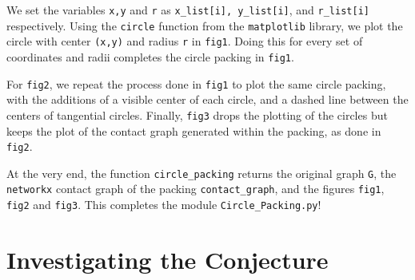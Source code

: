 \begin{flushleft}
We set the variables \texttt{x,y} and \texttt{r} as \texttt{x\_list[i], y\_list[i]}, and  \texttt{r\_list[i]} respectively. Using the \texttt{circle} function from the \texttt{matplotlib} library, we plot the circle with center \texttt{(x,y)} and radius \texttt{r} in \texttt{fig1}. Doing this for every set of coordinates and radii completes the circle packing in \texttt{fig1}.    
\end{flushleft}

\begin{flushleft}
For \texttt{fig2}, we repeat the process done in \texttt{fig1} to plot the same circle packing, with the additions of a visible center of each circle, and a dashed line between the centers of tangential circles. Finally, \texttt{fig3} drops the plotting of the circles but keeps the plot of the contact graph generated within the packing, as done in \texttt{fig2}.
\end{flushleft}

\begin{flushleft}
At the very end, the function \texttt{circle\_packing} returns the original graph \texttt{G}, the \texttt{networkx} contact graph of the packing \texttt{contact\_graph}, and the figures \texttt{fig1}, \texttt{fig2} and \texttt{fig3}. This completes the module \texttt{Circle\_Packing.py}!
\end{flushleft}

\section{Investigating the Conjecture}

